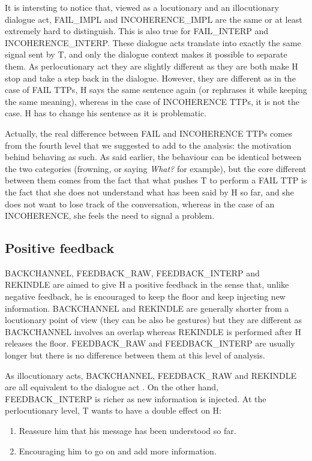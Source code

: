          It is intersting to notice that, viewed as a locutionary and an illocutionary dialogue act, FAIL\_IMPL and INCOHERENCE\_IMPL are the same or at least extremely hard to distinguish. This is also true for FAIL\_INTERP and INCOHERENCE\_INTERP. These dialogue acts translate into exactly the same signal sent by T, and only the dialogue context makes it possible to separate them. As perlocutionary act they are slightly different as they are both make H stop and take a step back in the dialogue. However, they are different as in the case of FAIL TTPs, H says the same sentence again (or rephrases it while keeping the same meaning), whereas in the case of INCOHERENCE TTPs, it is not the case. H has to change his sentence as it is problematic.

         Actually, the real difference between FAIL and INCOHERENCE TTPs comes from the fourth level that we suggested to add to the analysis: the motivation behind behaving as such. As said earlier, the behaviour can be identical between the two categories (frowning, or saying \textit{What?} for example), but the core different between them comes from the fact that what pushes T to perform a FAIL TTP is the fact that she does not understand what has been said by H so far, and she does not want to lose track of the conversation, whereas in the case of an INCOHERENCE, she feels the need to signal a problem.

    \subsection{Positive feedback}
		
					BACKCHANNEL, FEEDBACK\_RAW, FEEDBACK\_INTERP and REKINDLE are aimed to give H a positive feedback in the sense that, unlike negative feedback, he is encouraged to keep the floor and keep injecting new information. BACKCHANNEL and REKINDLE are generally shorter from a locutionary point of view (they can be also be gestures) but they are different as BACKCHANNEL involves an overlap whereas REKINDLE is performed after H releases the floor. FEEDBACK\_RAW and FEEDBACK\_INTERP are usually longer but there is no difference between them at this level of analysis.
					
					As illocutionary acts, BACKCHANNEL, FEEDBACK\_RAW and REKINDLE are all equivalent to the dialogue act \cite{I understand what you said so far, please continue}. On the other hand, FEEDBACK\_INTERP is richer as new information is injected. At the perlocutionary level, T wants to have a double effect on H:
					\begin{enumerate}
						\item Reassure him that his message has been understood so far.
						\item Encouraging him to go on and add more information.
					\end{enumerate}
					
